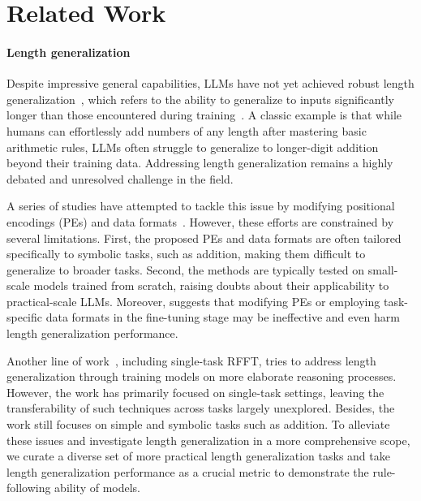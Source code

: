 \section{Related Work}
\paragraph{Length generalization} 
Despite impressive general capabilities, LLMs have not yet achieved robust length generalization~\citep{zhou2024transformers}, which refers to the ability to generalize to inputs significantly longer than those encountered during training~\citep{abbe2023generalization, anil2022exploring, zhou2023length}. A classic example is that while humans can effortlessly add numbers of any length after mastering basic arithmetic rules, LLMs often struggle to generalize to longer-digit addition beyond their training data. Addressing length generalization remains a highly debated and unresolved challenge in the field.

A series of studies have attempted to tackle this issue by modifying positional encodings (PEs) and data formats~\citep{zhou2023length, shen2023positional, kazemnejad2023impact, lee2023teaching, zhou2024transformers,cho2024positioncouplingimprovinglength, mcleish2024transformersarithmeticrightembeddings, cho2024arithmetictransformerslengthgeneralizeoperand}. However, these efforts are constrained by several limitations. First, the proposed PEs and data formats are often tailored specifically to symbolic tasks, such as addition, making them difficult to generalize to broader tasks. Second, the methods are typically tested on small-scale models trained from scratch, raising doubts about their applicability to practical-scale LLMs. Moreover, \citet{yang2024numbercookbooknumberunderstanding} suggests that modifying PEs or employing task-specific data formats in the fine-tuning stage may be ineffective and even harm length generalization performance.

Another line of work~\citep{hu2024casebasedrulebasedtransformersmath,hou2024universallengthgeneralizationturing, yang2024numbercookbooknumberunderstanding}, including single-task RFFT, tries to address length generalization through training models on more elaborate reasoning processes. However, the work has primarily focused on single-task settings, leaving the transferability of such techniques across tasks largely unexplored. Besides, the work still focuses on simple and symbolic tasks such as addition. To alleviate these issues and investigate length generalization in a more comprehensive scope, we curate a diverse set of more practical length generalization tasks and take length generalization performance as a crucial metric to demonstrate the rule-following ability of models.

